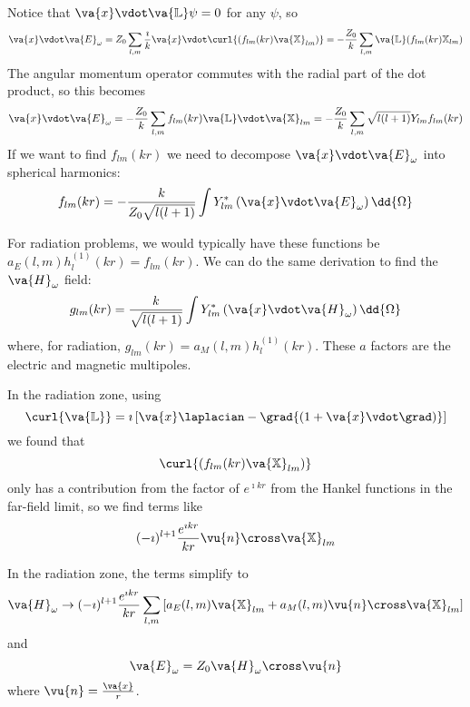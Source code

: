 \documentclass[a4paper,twoside,master.tex]{subfiles}
\begin{document}
Notice that $ \va{x} \vdot \va{\mathbb{L}} \psi = 0 $ for any $ \psi $, so
\begin{equation}
    \va{x} \vdot \va{E}_{\omega} = Z_0 \sum_{l,m} \frac{\imath}{k} \va{x} \vdot \curl{(f_{lm}(kr) \va{\mathbb{X}}_{lm})} = - \frac{Z_0}{k} \sum_{l,m} \va{\mathbb{L}}(f_{lm}(kr) \mathbb{X}_{lm})
\end{equation}
The angular momentum operator commutes with the radial part of the dot product, so this becomes
\begin{equation}
    \va{x} \vdot \va{E}_{\omega} = - \frac{Z_0}{k} \sum_{l,m} f_{lm}(kr) \va{\mathbb{L}} \vdot \va{\mathbb{X}}_{lm} = - \frac{Z_0}{k} \sum_{l,m} \sqrt{l(l+1)} Y_{lm} f_{lm}(kr) 
\end{equation}
If we want to find $ f_{lm}(kr) $ we need to decompose $ \va{x} \vdot \va{E}_{\omega} $ into spherical harmonics:
\begin{equation}
    f_{lm}(kr) = - \frac{k}{Z_0 \sqrt{l(l+1)}} \int Y_{lm}^* \left( \va{x} \vdot \va{E}_{\omega} \right) \dd{\Omega}
\end{equation}

For radiation problems, we would typically have these functions be $ a_{E}(l,m) h_{l}^{(1)}(kr) = f_{lm}(kr) $. We can do the same derivation to find the $ \va{H}_{\omega} $ field:
\begin{equation}
    g_{lm}(kr) = \frac{k}{\sqrt{l(l+1)}} \int Y_{lm}^* \left( \va{x} \vdot \va{H}_{\omega} \right) \dd{\Omega}
\end{equation}
where, for radiation, $ g_{lm}(kr) = a_{M}(l,m) h_{l}^{(1)}(kr) $. These $ a $ factors are the electric and magnetic multipoles.

In the radiation zone, using
\begin{equation}
    \curl{ \va{\mathbb{L}}} = \imath \left[ \va{x} \laplacian - \grad{(1 + \va{x} \vdot \grad)} \right]
\end{equation}
we found that
\begin{equation}
    \curl{(f_{lm}(kr) \va{\mathbb{X}}_{lm})}
\end{equation}
only has a contribution from the factor of $ e^{\imath kr} $ from the Hankel functions in the far-field limit, so we find terms like
\begin{equation}
    (- \imath)^{l+1} \frac{e^{\imath kr}}{kr} \vu{n} \cross \va{\mathbb{X}}_{lm}
\end{equation}

In the radiation zone, the terms simplify to
\begin{equation}
    \va{H}_{\omega} \to (- \imath)^{l+1} \frac{e^{\imath kr}}{kr} \sum_{l,m} \left[ a_E(l,m) \va{\mathbb{X}}_{lm} + a_M(l,m) \vu{n} \cross \va{\mathbb{X}}_{lm} \right]
\end{equation}
and
\begin{equation}
    \va{E}_{\omega} = Z_0 \va{H}_{\omega} \cross \vu{n}
\end{equation}
where $ \vu{n} = \frac{\va{x}}{r} $.
\end{document}
